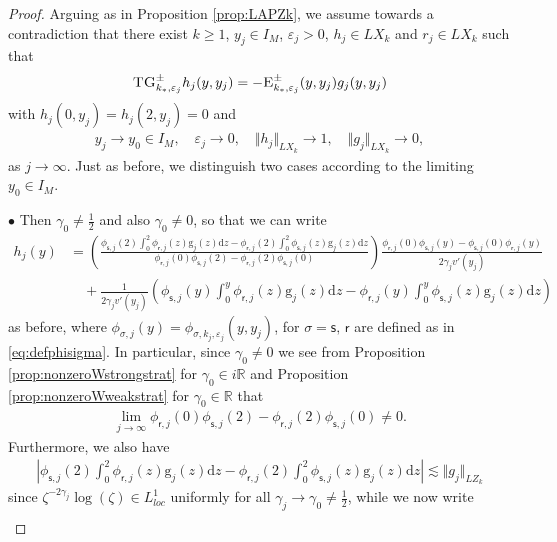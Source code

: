 \documentclass[11pt,reqno]{amsproc}
\newcommand{\bullpar}[1]{\vspace{.5em}\noindent $\bullet$ \normalfont {\bfseries #1.}}
\theoremstyle{definition}
\numberwithin{equation}{section}
\newcommand{\cJ}{{\mathcal{J}}}
\newcommand{\R}{{\mathbb R}}
\newcommand{\sr}{{\mathsf{r}}}
\newcommand{\s}{{\mathsf{s}}}
\renewcommand{\d}{\mathrm{d}}
\newcommand{\ep}{\varepsilon}
\begin{document}
\begin{proof}
Arguing as in Proposition \ref{prop:LAPZk}, we assume towards a contradiction that there exist $k\geq 1$, $y_j\in I_M$, $\ep_j>0$, $h_j\in LX_k$ and $r_j\in LX_k$ such that
\begin{align*}
\textsc{TG}_{k_*,\ep_j}^\pm h_j(y,y_j) = -\textsc{E}_{k_*,\ep_j}^\pm(y,y_j) g_j(y,y_j)
\end{align*}
with $h_j(0,y_j) = h_j(2,y_j)=0$ and
\begin{align*}
y_j\rightarrow y_0\in I_M, \quad \ep_j\rightarrow 0, \quad \Vert h_j \Vert_{LX_k}\rightarrow 1, \quad \Vert g_j \Vert_{LX_k}\rightarrow 0,
\end{align*}
as $j\rightarrow \infty$. Just as before, we distinguish two cases according to the limiting $y_0\in I_M$.

\bullpar{ Case $\cJ(y_0)\neq \frac14$} Then $\gamma_0\neq\frac12$ and also $\gamma_0\neq 0$, so that we can write 
\begin{align*}
h_j(y)&= \left( \frac{\phi_{\s,j}(2)\int_0^2 \phi_{\sr,j}(z) \mathrm{g}_j(z) \d z - \phi_{\sr,j}(2)\int_0^2 \phi_{\s,j}(z) \mathrm{g}_j(z)\d z }{\phi_{\sr,j}(0)\phi_{\s,j}(2) - \phi_{\sr,j}(2)\phi_{\s,j}(0)} \right)  \frac{\phi_{\sr,j}(0)\phi_{\s,j}(y) - \phi_{\s,j}(0)\phi_{\sr,j}(y)}{2\gamma_j v'(y_j)} \\
&\quad + \frac{1}{2\gamma_j v'(y_j)} \left( \phi_{\s,j}(y) \int_0^y \phi_{\sr,j}(z)\mathrm{g}_j(z) \d z - \phi_{\sr,j}(y) \int_0^y \phi_{\s,j}(z)\mathrm{g}_j(z) \d z \right)
\end{align*}
as before, where $\phi_{\sigma,j}(y)=\phi_{\sigma,k_j,\ep_j}(y,y_j)$, for $\sigma = \s,\,\sr$ are defined as in \eqref{eq:defphisigma}. In particular, since $\gamma_0\neq 0$ we see from Proposition \ref{prop:nonzeroWstrongstrat} for $\gamma_0\in i\R$ and Proposition \ref{prop:nonzeroWweakstrat} for $\gamma_0\in \R$ that 
\begin{align*}
\lim_{j\rightarrow\infty}\phi_{\sr,j}(0)\phi_{\s,j}(2) - \phi_{\sr,j}(2) \phi_{\s,j}(0) \neq 0.
\end{align*}
Furthermore, we also have
\begin{align*}
\left| \phi_{\s,j}(2)\int_0^2 \phi_{\sr,j}(z) \mathrm{g}_j(z) \d z - \phi_{\sr,j}(2)\int_0^2 \phi_{\s,j}(z) \mathrm{g}_j(z)\d z \right| \lesssim \Vert g_j \Vert_{LZ_k}
\end{align*}
since $\zeta^{-2\gamma_j}\log(\zeta) \in L^1_{loc}$ uniformly for all $\gamma_j\rightarrow \gamma_0 \neq \frac12$, while we now write 
\begin{align*}

\end{align*}
\end{proof}
\end{document}
